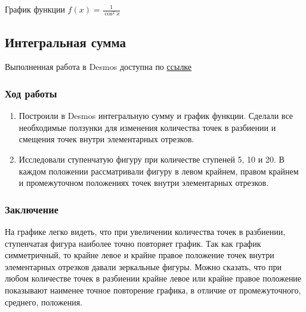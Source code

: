 \documentclass{article}
\begin{document}
\begin{center}
    
    \caption{График функции $f(x) = \frac{1}{\cos^2{x}}$}
    \label{fig:task1}
\end{center}

\subsection{Интегральная сумма}

Выполненная работа в Desmos доступна по 
\href{https://www.desmos.com/calculator/h7fwirbtli?lang=ru}{ссылке}

\subsubsection*{Ход работы}

\begin{enumerate}
    \item Построили в Desmos интегральную сумму и график функции.
    Сделали все необходимые ползунки для изменения количества точек в разбиении
    и смещения точек внутри элементарных отрезков.
    \item Исследовали ступенчатую фигуру при количестве ступеней 5, 10 и 20. В каждом положении рассматривали фигуру в левом крайнем, правом крайнем и промежуточном положениях точек внутри элементарных отрезков.
\end{enumerate}

\subsubsection*{Заключение}

На графике легко видеть, что при увеличении количества точек в разбиении, ступенчатая фигура наиболее точно повторяет график.
Так как график симметричный, то крайне левое и крайне правое положение точек внутри элементарных отрезков давали зеркальные фигуры. Можно сказать, что при любом количестве точек в разбиении крайне левое или крайне правое положение показывают наименее точное повторение графика, в отличие от промежуточного, среднего, положения.
\end{document}
